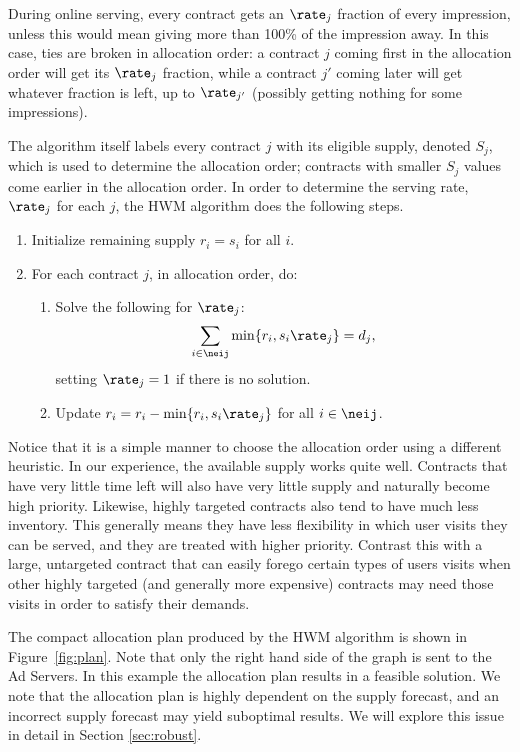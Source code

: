During online serving, every contract gets an $\rate_j$ fraction of
every impression, unless this would mean giving more than 100\% of
the impression away.  In this case, ties are broken in allocation
order: a contract $j$ coming first in the allocation order will get
its $\rate_j$ fraction, while a contract $j'$ coming later will get
whatever fraction is left, up to $\rate_{j'}$  (possibly getting
nothing for some impressions).

The algorithm itself labels every contract $j$ with its eligible supply, denoted $S_j$, which is used to
determine the allocation order; contracts with smaller $S_j$ values come earlier in the allocation order.
In order to determine the serving rate, $\rate_j$ for each $j$, the HWM algorithm does the following steps.
\begin{enumerate}\itemsep=0in
\item Initialize remaining supply $r_i = s_i$ for all $i$.
\item For each contract $j$, in allocation order, do:
    \begin{enumerate}\itemsep=0in
    \item Solve the following for $\rate_j$:
        $$\sum_{i\in\neij} \min\{ r_i , s_i \rate_j\} = d_j , $$
        setting $\rate_j = 1$ if there is no solution.
    \item Update $r_i = r_i - \min\{ r_i, s_i \rate_j\}$ for all $i\in\neij$.
    \end{enumerate}
\end{enumerate}
Notice that it is a simple manner to choose the allocation order using a different heuristic.  In our experience, the available
supply works quite well.  Contracts that have very little time left will also have very little supply and naturally become high
priority.  Likewise, highly targeted contracts also tend to have much less inventory.  This generally means they have less flexibility
in which user visits they can be served, and they are treated with higher priority.
Contrast this with a large, untargeted contract that can easily forego certain types of users visits when other highly targeted (and generally
more expensive) contracts may need those visits in order to satisfy their demands.

The compact allocation plan produced by the HWM algorithm is shown in Figure~\ref{fig:plan}.
Note that only the right hand side of the graph is sent to the Ad Servers.
In this example the allocation plan results in a feasible solution.
We note that the allocation plan is highly dependent on the supply forecast,
and an incorrect supply forecast may yield suboptimal results. We will explore this issue in detail in Section \ref{sec:robust}.

